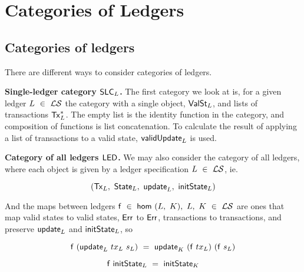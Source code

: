 \section{Categories of Ledgers}
\label{sec:cats}

\subsection{Categories of ledgers}

There are different ways to consider categories of ledgers.

\textbf{Single-ledger category $\mathsf{SLC}_L$.} The first category we look at
is, for a given ledger $L~\in~\mathcal{L}\mathcal{S}$ the category with a single object,
$\mathsf{ValSt}_L$, and lists of transactions $\mathsf{Tx}_L^{*}$.
The empty list is the identity function in the category, and composition of
functions is list concatenation. To calculate the result of applying
a list of transactions to a valid state, $\mathsf{validUpdate}_L$ is used.

\textbf{Category of all ledgers $\mathsf{LED}$.} We may also consider the category of all
ledgers, where each object is given by a ledger specification $L~\in~\mathcal{L}\mathcal{S}$, ie.

\[ (\mathsf{Tx}_L,~\mathsf{State}_L,~\mathsf{update}_L,~\mathsf{initState}_L) \]

And the maps between ledgers $\mathsf{f}~\in~\mathsf{hom}~(L,~K),~L,~K~\in~\mathcal{L}\mathcal{S}$ are ones that
map valid states to valid states, $\mathsf{Err}$ to $\mathsf{Err}$, transactions to transactions,
and preserve $\mathsf{update}_L$ and $\mathsf{initState}_L$, so

\[ \mathsf{f}~(\mathsf{update}_L~tx_L~s_L)~=~\mathsf{update}_K~(\mathsf{f}~tx_L)~(\mathsf{f}~s_L) \]

\[ \mathsf{f}~\mathsf{initState}_L~=~\mathsf{initState}_K \]
